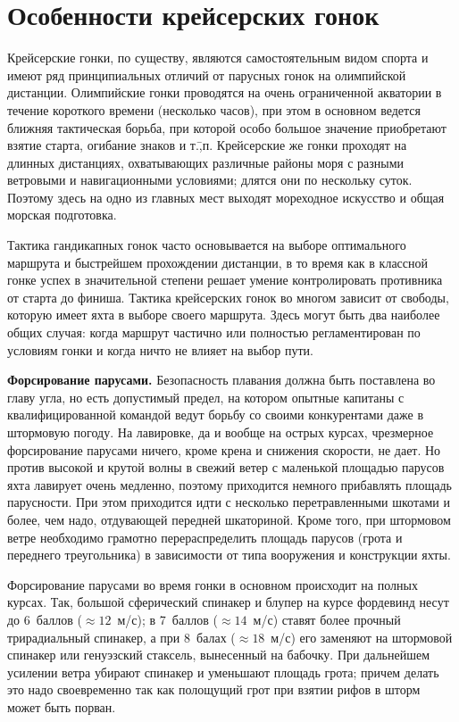 \documentclass[a4paper, 12pt, twoside, final, book, russian, fittopage, cyremdash]{ncc}
\begin{document}
\section{Особенности крейсерских гонок}

Крейсерские гонки, по существу, являются самостоятельным видом спорта и имеют ряд принципиальных отличий от парусных гонок на олимпийской дистанции. Олимпийские гонки проводятся на очень ограниченной акватории в течение короткого времени (несколько часов), при этом в основном ведется ближняя тактическая борьба, при которой особо большое значение приобретают взятие старта, огибание знаков и т.\=,п. Крейсерские же гонки проходят на длинных дистанциях, охватывающих различные районы моря с разными ветровыми и навигационными условиями; длятся они по нескольку суток. Поэтому здесь на одно из главных мест выходят мореходное искусство и общая морская подготовка.

Тактика гандикапных гонок часто основывается на выборе оптимального маршрута и быстрейшем прохождении дистанции, в то время как в классной гонке успех в значительной степени решает умение контролировать противника от старта до финиша. Тактика крейсерских гонок во многом зависит от свободы, которую имеет яхта в выборе своего маршрута. Здесь могут быть два наиболее общих случая: когда маршрут частично или полностью регламентирован по условиям гонки и когда ничто не влияет на выбор пути. 

\textbf{Форсирование парусами.} Безопасность плавания должна быть поставлена во главу угла, но есть допустимый предел, на котором опытные капитаны с квалифицированной командой ведут борьбу со своими конкурентами даже в штормовую погоду. На лавировке, да и вообще на острых курсах, чрезмерное форсирование парусами ничего, кроме крена и снижения скорости, не дает. Но против высокой и крутой волны в свежий ветер с маленькой площадью парусов яхта лавирует очень медленно, поэтому приходится немного прибавлять площадь парусности. При этом приходится идти с несколько перетравленными шкотами и более, чем надо, отдувающей передней шкаториной. Кроме того, при штормовом ветре необходимо грамотно перераспределить площадь парусов (грота и переднего треугольника) в зависимости от типа вооружения и конструкции яхты.

Форсирование парусами во время гонки в основном происходит на полных курсах. Так, большой сферический спинакер и блупер на курсе фордевинд несут до 6~баллов ($\approx 12$~м/с); в 7~баллов ($\approx 14$~м/с) ставят более прочный трирадиальный спинакер, а при 8~балах ($\approx 18$~м/с) его заменяют на штормовой спинакер или генуэзский стаксель, вынесенный на бабочку. При дальнейшем усилении ветра убирают спинакер и уменьшают площадь грота; причем делать это надо своевременно так как полощущий грот при взятии рифов в шторм может быть порван.
\end{document}
